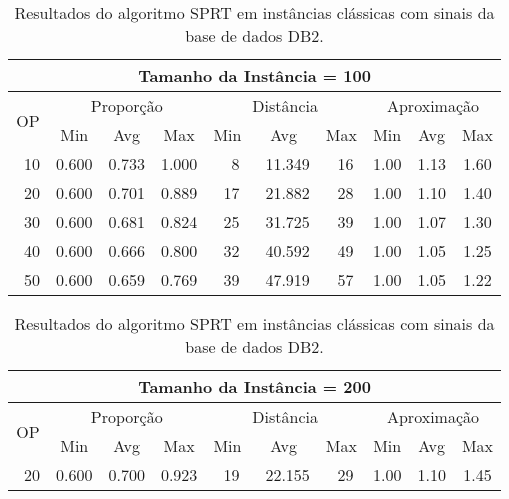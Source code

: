 \begin{table}[!tb]
\caption{Resultados do algoritmo SPRT em instâncias clássicas com sinais da base de dados DB2.}
\label{table:YDCKQRVK}
\begin{center}
\scriptsize
{\def\arraystretch{1.05}\tabcolsep=8pt
\begin{tabular}{|c|c|c|c|c|c|c|c|c|c|}
\hline
\multicolumn{10}{|c|}{\bf Tamanho da Instância = 100}                                                                          \\ \hline
\multirow{2}{*}{OP} & \multicolumn{3}{c|}{Proporção} & \multicolumn{3}{c|}{Distância} & \multicolumn{3}{c|}{Aproximação}   \\ \cline{2-10}
                    & Min       & Avg      & Max      & Min      & Avg      & Max     & Min     & Avg    & Max             \\ \hline
~10                 & 0.600     & 0.733    & 1.000    & ~~8      & ~11.349  & ~16     & 1.00    & 1.13   & 1.60            \\ \hline
~20                 & 0.600     & 0.701    & 0.889    & ~17      & ~21.882  & ~28     & 1.00    & 1.10   & 1.40            \\ \hline
~30                 & 0.600     & 0.681    & 0.824    & ~25      & ~31.725  & ~39     & 1.00    & 1.07   & 1.30            \\ \hline
~40                 & 0.600     & 0.666    & 0.800    & ~32      & ~40.592  & ~49     & 1.00    & 1.05   & 1.25            \\ \hline
~50                 & 0.600     & 0.659    & 0.769    & ~39      & ~47.919  & ~57     & 1.00    & 1.05   & 1.22            \\ \hline
\end{tabular}%
\vspace{5pt}
\begin{tabular}{|c|c|c|c|c|c|c|c|c|c|}
\hline
\multicolumn{10}{|c|}{\bf Tamanho da Instância = 200}                                                                          \\ \hline
\multirow{2}{*}{OP} & \multicolumn{3}{c|}{Proporção} & \multicolumn{3}{c|}{Distância} & \multicolumn{3}{c|}{Aproximação}   \\ \cline{2-10}
                    & Min       & Avg      & Max      & Min      & Avg      & Max     & Min     & Avg    & Max             \\ \hline
~20                 & 0.600     & 0.700    & 0.923    & ~19      & ~22.155  & ~29     & 1.00    & 1.10   & 1.45            \\ \hline

\end{tabular}}
\end{center}
\end{table}
